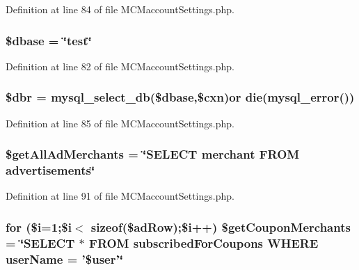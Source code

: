Definition at line 84 of file M\-C\-Maccount\-Settings.\-php.

\hypertarget{_m_c_maccount_settings_8php_abd981912075cb8356ca370b4fefdfed7}{
\subsubsection[{\$dbase}]{\setlength{\rightskip}{0pt plus 5cm}\$dbase = \char`\"{}test\char`\"{}}}\label{_m_c_maccount_settings_8php_abd981912075cb8356ca370b4fefdfed7}


Definition at line 82 of file M\-C\-Maccount\-Settings.\-php.

\hypertarget{_m_c_maccount_settings_8php_a88fea670240e5fa6ae306a286acaa0fd}{
\subsubsection[{\$dbr}]{\setlength{\rightskip}{0pt plus 5cm}\$dbr = mysql\-\_\-select\-\_\-db(\$dbase,\$cxn)or die(mysql\-\_\-error())}}\label{_m_c_maccount_settings_8php_a88fea670240e5fa6ae306a286acaa0fd}


Definition at line 85 of file M\-C\-Maccount\-Settings.\-php.

\hypertarget{_m_c_maccount_settings_8php_a0c83e0e6bd8e9d8deee8baa4f03f6fc2}{
\subsubsection[{\$get\-All\-Ad\-Merchants}]{\setlength{\rightskip}{0pt plus 5cm}\$get\-All\-Ad\-Merchants = \char`\"{}S\-E\-L\-E\-C\-T merchant F\-R\-O\-M advertisements\char`\"{}}}\label{_m_c_maccount_settings_8php_a0c83e0e6bd8e9d8deee8baa4f03f6fc2}


Definition at line 91 of file M\-C\-Maccount\-Settings.\-php.

\hypertarget{_m_c_maccount_settings_8php_ad7ff3bd6b64ab03c84762e87bdb49b94}{
\subsubsection[{\$get\-Coupon\-Merchants}]{\setlength{\rightskip}{0pt plus 5cm}for (\$i=1;\$i$<$ sizeof(\$ad\-Row);\$i++) \$get\-Coupon\-Merchants = \char`\"{}S\-E\-L\-E\-C\-T $\ast$ F\-R\-O\-M subscribed\-For\-Coupons W\-H\-E\-R\-E user\-Name = '\$user'\char`\"{}}}\label{_m_c_maccount_settings_8php_ad7ff3bd6b64ab03c84762e87bdb49b94}


